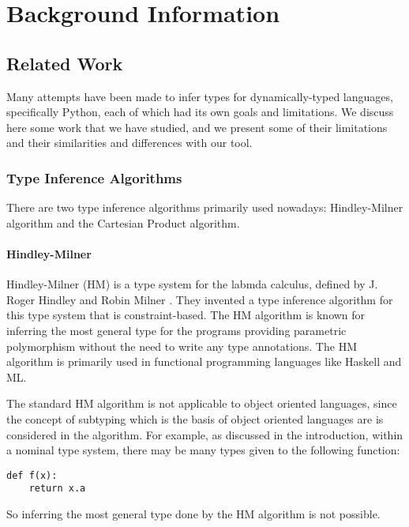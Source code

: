 
\chapter{Background Information}\label{chapter:background}

\section{Related Work}
Many attempts have been made to infer types for dynamically-typed languages, specifically Python, each of which had its own goals and limitations. We discuss here some work that we have studied, and we present some of their limitations and their similarities and differences with our tool.

\subsection{Type Inference Algorithms}
There are two type inference algorithms primarily used nowadays: Hindley-Milner algorithm and the Cartesian Product algorithm.

\subsubsection{Hindley-Milner}
Hindley-Milner (HM) is a type system for the labmda calculus, defined by J. Roger Hindley and Robin Milner \cite{hindley, milner}. They invented a type inference algorithm for this type system that is constraint-based. The HM algorithm is known for inferring the most general type for the programs providing parametric polymorphism without the need to write any type annotations. The HM algorithm is primarily used in functional programming languages like Haskell and ML.

The standard HM algorithm is not applicable to object oriented languages, since the concept of subtyping which is the basis of object oriented languages are is considered in the algorithm. For example, as discussed in the introduction, within a nominal type system, there may be many types given to the following function:
\begin{lstlisting}
def f(x):
	return x.a
\end{lstlisting}
So inferring the most general type done by the HM algorithm is not possible.
